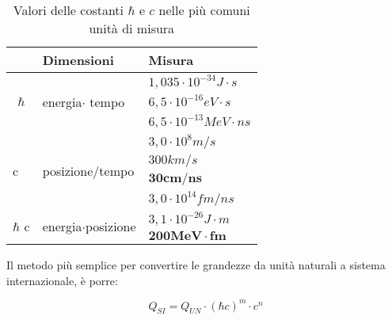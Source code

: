 \documentclass [a4paper, twoside] {book}
\begin{document}
\begin{table}
\center
\begin{tabular}{|l|l|l|}
\hline
                                                            & Dimensioni                                             & Misura                           \\ \hline
\multicolumn{1}{|c|}{\multirow{3}{*}{$\hbar$}} & \multirow{3}{*}{energia$\cdot$ tempo}     & $1,035 \cdot 10^{-34} J\cdot s$  \\ \cline{3-3} 
\multicolumn{1}{|c|}{}                                      &                                                        & $6,5 \cdot 10^{-16} eV\cdot s$   \\ \cline{3-3} 
\multicolumn{1}{|c|}{}                                      &                                                        & $6,5 \cdot 10^{-13} MeV\cdot ns$ \\ \hline
\multirow{4}{*}{c}                                          & \multirow{4}{*}{posizione/tempo}                       & $3,0\cdot10^8 m/s$               \\ \cline{3-3} 
                                                            &                                                        & $300 km/s$                       \\ \cline{3-3} 
                                                            &                                                        & $\mathbf{30 cm/ns}$              \\ \cline{3-3} 
                                                            &                                                        & $3,0\cdot10^{14} fm/ns$          \\ \hline
\multirow{2}{*}{$\hbar$ c}                     & \multirow{2}{*}{energia$\cdot $posizione} & $3,1\cdot 10^{-26} J\cdot m$     \\ \cline{3-3} 
                                                            &                                                        & $\mathbf{200 MeV \cdot fm}$            \\ \hline
\end{tabular}
\caption{Valori delle costanti $\hbar$ e $c$ nelle più comuni unità di misura}
\end{table}

Il metodo più semplice per convertire le grandezze da unità naturali a sistema internazionale, è porre:

\begin{equation}
Q_{SI}=Q_{UN}\cdot(\hbar c)^m\cdot c^n
\end{equation}
\end{document}
